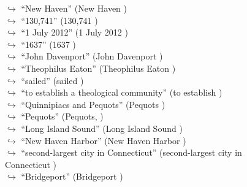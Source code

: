 \documentclass[11pt,a4paper, onecolumn]{article}
\begin{document}
\begin{figure}[t] \small \begin{tcolorbox}[boxsep=0pt,left=5pt,right=0pt,top=2pt,colback = yellow!5] \begin{dialogue}
 \small 
\colorbox{pink!25}{$\hookrightarrow$}
{ ``New Haven'' (New Haven ) }
\\
\colorbox{pink!25}{$\hookrightarrow$}
{ ``130,741'' (130,741 ) }
\\
\colorbox{pink!25}{$\hookrightarrow$}
{ ``1 July 2012'' (1 July 2012 ) }
\\
\colorbox{pink!25}{$\hookrightarrow$}
{ ``1637'' (1637 ) }
\\
\colorbox{pink!25}{$\hookrightarrow$}
{ ``John Davenport'' (John Davenport ) }
\\
\colorbox{pink!25}{$\hookrightarrow$}
{ ``Theophilus Eaton'' (Theophilus Eaton ) }
\\
\colorbox{pink!25}{$\hookrightarrow$}
{ ``sailed'' (sailed ) }
\\
\colorbox{pink!25}{$\hookrightarrow$}
{ ``to establish a theological community'' (to establish ) }
\\
\colorbox{pink!25}{$\hookrightarrow$}
{ ``Quinnipiacs and Pequots'' (Pequots ) }
\\
\colorbox{pink!25}{$\hookrightarrow$}
{ ``Pequots'' (Pequots, ) }
\\
\colorbox{pink!25}{$\hookrightarrow$}
{ ``Long Island Sound'' (Long Island Sound ) }
\\
\colorbox{pink!25}{$\hookrightarrow$}
{ ``New Haven Harbor'' (New Haven Harbor ) }
\\
\colorbox{pink!25}{$\hookrightarrow$}
{ ``second-largest city in Connecticut'' (second-largest city in Connecticut ) }
\\
\colorbox{pink!25}{$\hookrightarrow$}
{ ``Bridgeport'' (Bridgeport ) }
\\
 \end{dialogue}\end{tcolorbox}\end{figure}
\end{document}
